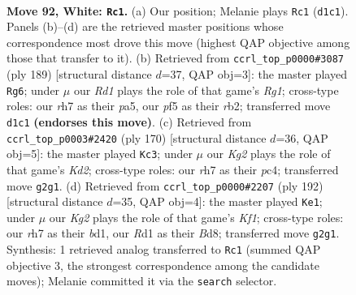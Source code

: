 \documentclass[11pt]{article}
\begin{document}
\clearpage

\begin{figure}[p]\centering
\begin{subfigure}{0.46\textwidth}\centering
\resizebox{\linewidth}{!}{%
\newchessgame
\chessboard[
  setfen={8/4k2r/p7/P1p2p1p/1pp2P1P/4P1P1/1P4K1/3R4 w - - 4 92},
  showmover=false,
  pgfstyle=straightmove, color=movearrow, markmove={d1-c1}
]}
\caption{}
\end{subfigure}\hfill
\begin{subfigure}{0.46\textwidth}\centering
\resizebox{\linewidth}{!}{%
\newchessgame
\chessboard[
  setfen={4k1r1/4p3/p2pP3/P4p1p/1pP4P/4KPP1/1R6/8 b - - 0 95},
  showmover=false,
  pgfstyle=straightmove, color=movearrow, markmove={g8-g6}
]}
\caption{}
\end{subfigure}
\\[4pt]
\begin{subfigure}{0.46\textwidth}\centering
\resizebox{\linewidth}{!}{%
\newchessgame
\chessboard[
  setfen={8/5k2/1p6/1P2pp1p/2pP2pP/4P1P1/3K1P2/8 w - - 0 86},
  showmover=false,
  pgfstyle=straightmove, color=movearrow, markmove={d2-c3}
]}
\caption{}
\end{subfigure}\hfill
\begin{subfigure}{0.46\textwidth}\centering
\resizebox{\linewidth}{!}{%
\newchessgame
\chessboard[
  setfen={3B4/5p1p/4p3/2k1PpP1/p4P2/P5P1/8/3b1K2 w - - 74 97},
  showmover=false,
  pgfstyle=straightmove, color=movearrow, markmove={f1-e1}
]}
\caption{}
\end{subfigure}
\caption{\textbf{Move 92, White: \texttt{Rc1}.} (a) Our position; Melanie plays \texttt{Rc1} (\texttt{d1c1}). Panels (b)--(d) are the retrieved master positions whose correspondence most drove this move (highest QAP objective among those that transfer to it). (b) Retrieved from \texttt{ccrl\_top\_p0000\#3087} (ply 189) [structural distance $d$=37, QAP obj=3]: the master played \texttt{Rg6}; under $\mu$ our \emph{Rd1} plays the role of that game's \emph{Rg1}; cross-type roles: our \emph{r}h7 as their \emph{p}a5, our \emph{p}f5 as their \emph{r}b2; transferred move \texttt{d1c1} \textbf{(endorses this move)}. (c) Retrieved from \texttt{ccrl\_top\_p0003\#2420} (ply 170) [structural distance $d$=36, QAP obj=5]: the master played \texttt{Kc3}; under $\mu$ our \emph{Kg2} plays the role of that game's \emph{Kd2}; cross-type roles: our \emph{r}h7 as their \emph{p}c4; transferred move \texttt{g2g1}. (d) Retrieved from \texttt{ccrl\_top\_p0000\#2207} (ply 192) [structural distance $d$=35, QAP obj=4]: the master played \texttt{Ke1}; under $\mu$ our \emph{Kg2} plays the role of that game's \emph{Kf1}; cross-type roles: our \emph{r}h7 as their \emph{b}d1, our \emph{R}d1 as their \emph{B}d8; transferred move \texttt{g2g1}. Synthesis: 1 retrieved analog transferred to \texttt{Rc1} (summed QAP objective 3, the strongest correspondence among the candidate moves); Melanie committed it via the \texttt{search} selector.}
\label{fig:thought-m182}
\end{figure}
\end{document}
